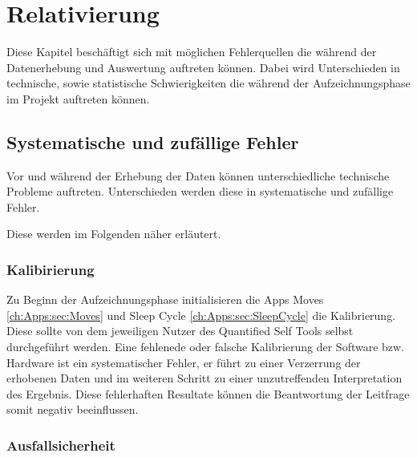 
\chapter{Relativierung}
\label{ch:Relativierung}

Diese Kapitel beschäftigt sich mit möglichen Fehlerquellen die während der Datenerhebung und Auswertung auftreten können. 
Dabei wird Unterschieden in technische, sowie statistische Schwierigkeiten die während der Aufzeichnungsphase im Projekt auftreten können.

\section{Systematische und zufällige Fehler}
\label{ch:Relativierung:sec:SystematischeUndZufälligeFehler}

Vor und während der Erhebung der Daten können unterschiedliche technische Probleme auftreten.
Unterschieden werden diese in systematische und zufällige Fehler.

Diese werden im Folgenden näher erläutert.

\subsection{Kalibirierung}
\label{ch:Relativierung:sec:SystematischeUndZufälligeFehler:subsec:Kalibrierung}

Zu Beginn der Aufzeichnungsphase initialisieren die Apps Moves \ref{ch:Apps:sec:Moves} und Sleep Cycle \ref{ch:Apps:sec:SleepCycle} die Kalibrierung.
Diese sollte von dem jeweiligen Nutzer des Quantified Self Tools selbst durchgeführt werden.
Eine fehlenede oder  falsche Kalibrierung der Software bzw. Hardware ist ein systematischer Fehler, er führt zu einer Verzerrung der erhobenen Daten und im weiteren Schritt zu einer unzutreffenden Interpretation des Ergebnis.
Diese fehlerhaften Resultate können die Beantwortung der Leitfrage somit negativ beeinflussen. 


\subsection{Ausfallsicherheit}
\label{ch:Relativierung:sec:SystematischeUndZufälligeFehler:subsec:Ausfallsicherheit}

